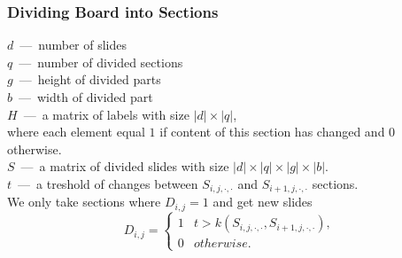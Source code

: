\begin{frame}
  \frametitle{Dividing Board into Sections}
  $d$~---~number of slides \\
  $q$~---~number of divided sections \\
  $g$~---~height of divided parts \\ 
  $b$~---~width of divided part \\
  $H$~---~a matrix of labels with size 
  $\left|d  \right|   \times   \left|q  \right|$, \\
  where each element equal $1$ if content of this section has changed and $0$ otherwise. \\
  $S$~---~a matrix of divided slides with size
  $\left|d \right|  \times   \left|q  \right|   \times  \left|g \right|  \times   \left|b \right|$. \\
  $t$~---~a treshold of changes
  between $S_{i,j,\cdot,\cdot}$ and $S_{i+1,j,\cdot,\cdot}$ sections.\\
  We only take sections where $D_{i,j} = 1$ and get new slides
  \begin{equation*}
    D_{i,j} =
      \begin{cases}
        1 & t > k\left( S_{i,j,\cdot,\cdot},S_{i+1,j,\cdot,\cdot} \right), \\
        0 & otherwise.
      \end{cases}
  \end{equation*}
\end{frame}
